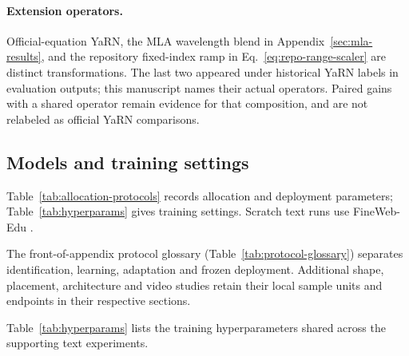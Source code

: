 \paragraph{Extension operators.}
Official-equation YaRN, the MLA wavelength blend in Appendix~\ref{sec:mla-results}, and the repository fixed-index ramp in Eq.~\eqref{eq:repo-range-scaler} are distinct transformations. The last two appeared under historical YaRN labels in evaluation outputs; this manuscript names their actual operators. Paired gains with a shared operator remain evidence for that composition, and are not relabeled as official YaRN comparisons.

\FloatBarrier
\subsection{Models and training settings}

Table~\ref{tab:allocation-protocols} records allocation and deployment parameters; Table~\ref{tab:hyperparams} gives training settings.
Scratch text runs use FineWeb-Edu \citep{penedo2024fineweb}.

The front-of-appendix protocol glossary (Table~\ref{tab:protocol-glossary}) separates identification, learning, adaptation and frozen deployment. Additional shape, placement, architecture and video studies retain their local sample units and endpoints in their respective sections.


Table~\ref{tab:hyperparams} lists the training hyperparameters shared across
the supporting text experiments.


